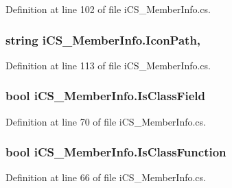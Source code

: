 Definition at line 102 of file i\+C\+S\+\_\+\+Member\+Info.\+cs.

\hypertarget{classi_c_s___member_info_afcf3e1b120443ac0b1b2e9982197e8a3}{
\subsubsection[{Icon\+Path}]{\setlength{\rightskip}{0pt plus 5cm}string i\+C\+S\+\_\+\+Member\+Info.\+Icon\+Path\hspace{0.3cm}{\ttfamily [get]}, {\ttfamily [set]}}}\label{classi_c_s___member_info_afcf3e1b120443ac0b1b2e9982197e8a3}


Definition at line 113 of file i\+C\+S\+\_\+\+Member\+Info.\+cs.

\hypertarget{classi_c_s___member_info_a20049900cace447961b1102258748b7f}{
\subsubsection[{Is\+Class\+Field}]{\setlength{\rightskip}{0pt plus 5cm}bool i\+C\+S\+\_\+\+Member\+Info.\+Is\+Class\+Field\hspace{0.3cm}{\ttfamily [get]}}}\label{classi_c_s___member_info_a20049900cace447961b1102258748b7f}


Definition at line 70 of file i\+C\+S\+\_\+\+Member\+Info.\+cs.

\hypertarget{classi_c_s___member_info_aa22d83e92ffddaf613d61cb400e53acd}{
\subsubsection[{Is\+Class\+Function}]{\setlength{\rightskip}{0pt plus 5cm}bool i\+C\+S\+\_\+\+Member\+Info.\+Is\+Class\+Function\hspace{0.3cm}{\ttfamily [get]}}}\label{classi_c_s___member_info_aa22d83e92ffddaf613d61cb400e53acd}


Definition at line 66 of file i\+C\+S\+\_\+\+Member\+Info.\+cs.

